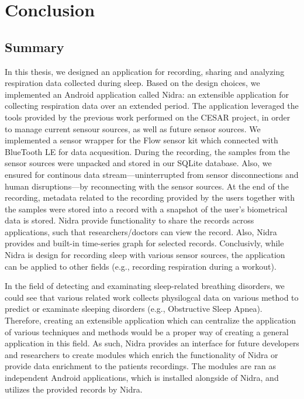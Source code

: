 \chapter{Conclusion}

\section{Summary}
In this thesis, we designed an application for recording, sharing and analyzing respiration data collected during sleep. Based on the design choices, we implemented an Android application called Nidra: an extensible application for collecting respiration data over an extended period. The application leveraged the tools provided by the previous work performed on the CESAR project, in order to manage current sensour sources, as well as future sensor sources. We implemented a sensor wrapper for the Flow sensor kit which connected with BlueTooth LE for data acquesition. During the recording, the samples from the sensor sources were unpacked and stored in our SQLite database. Also, we ensured for continous data stream---uninterrupted from sensor disconnections and human disruptions---by reconnecting with the sensor sources. At the end of the recording, metadata related to the recording provided by the users together with the samples were stored into a record with a snapshot of the user's biometrical data is stored. Nidra provide functionality to share the records across applications, such that researchers/doctors can view the record. Also, Nidra provides and built-in time-series graph for selected records. Conclusivly, while Nidra is design for recording sleep with various sensor sources, the application can be applied to other fields (e.g., recording respiration during a workout).  

In the field of detecting and examinating sleep-related breathing disorders, we could see that various related work  collects physilogcal data on various method to predict or examinate sleeping disorders (e.g., Obstructive Sleep Apnea). Therefore, creating an extensible application which can centralize the application of various techniques and methods would be a proper way of creating a general application in this field. As such, Nidra provides an interface for future developers and researchers to create modules which enrich the functionality of Nidra or provide data enrichment to the patients recordings. The modules are ran as independent Android applications, which is installed alongside of Nidra, and utilizes the provided records by Nidra. 

